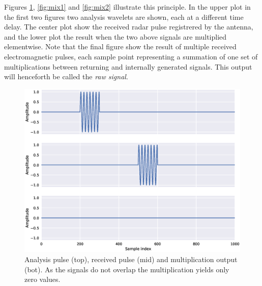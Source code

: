 
Figures \ref{fig:mix0}, \ref{fig:mix1} and \ref{fig:mix2} illustrate this principle. In the upper plot in the first two figures two analysis wavelets are shown, each at a different time delay. The center plot show the received radar pulse registrered by the antenna, and the lower plot the result when the two above signals are multiplied elementwise. Note that the final figure show the result of multiple received electromagnetic pulses, each sample point representing a summation of one set of multiplications between returning and internally generated signals. This output will henceforth be called the \emph{raw signal}.   

\begin{figure}[h]
	\centering
	\includegraphics[scale=0.5]{figs_temp/mixing0}
	\caption{Analysis pulse (top), received pulse (mid) and multiplication output (bot). As the signals do not overlap the multiplication yields only zero values.}
	\label{fig:mix0}
\end{figure}


